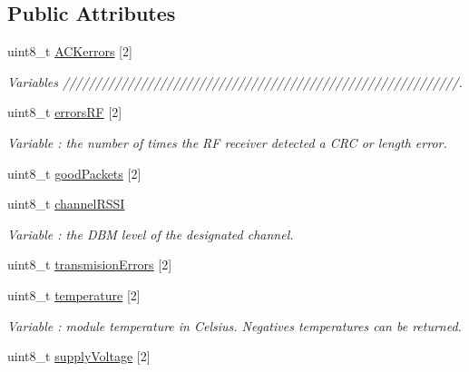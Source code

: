 \subsection*{Public Attributes}
\begin{DoxyCompactItemize}
\item 
uint8\+\_\+t \hyperlink{class_wasp_x_bee868_aa053fc0674006ca7bc24933afcb5e437}{A\+C\+Kerrors} \mbox{[}2\mbox{]}
\begin{DoxyCompactList}\small\item\em Variables /////////////////////////////////////////////////////////////. \end{DoxyCompactList}\item 
uint8\+\_\+t \hyperlink{class_wasp_x_bee868_a608f640c2c284306b5d25d106bc3927a}{errors\+RF} \mbox{[}2\mbox{]}\hypertarget{class_wasp_x_bee868_a608f640c2c284306b5d25d106bc3927a}{}\label{class_wasp_x_bee868_a608f640c2c284306b5d25d106bc3927a}

\begin{DoxyCompactList}\small\item\em Variable \+: the number of times the RF receiver detected a C\+RC or length error. \end{DoxyCompactList}\item 
uint8\+\_\+t \hyperlink{class_wasp_x_bee868_ab84ac057bd6a8698e3411523d71c6bfc}{good\+Packets} \mbox{[}2\mbox{]}
\item 
uint8\+\_\+t \hyperlink{class_wasp_x_bee868_a23f911b0cfd26c65ac259229231c3ffd}{channel\+R\+S\+SI}\hypertarget{class_wasp_x_bee868_a23f911b0cfd26c65ac259229231c3ffd}{}\label{class_wasp_x_bee868_a23f911b0cfd26c65ac259229231c3ffd}

\begin{DoxyCompactList}\small\item\em Variable \+: the D\+BM level of the designated channel. \end{DoxyCompactList}\item 
uint8\+\_\+t \hyperlink{class_wasp_x_bee868_af213d73818fe69e28e1ee308c19adc75}{transmision\+Errors} \mbox{[}2\mbox{]}
\item 
uint8\+\_\+t \hyperlink{class_wasp_x_bee868_a381d31ff7de24cd5f2e2a71f0c934f19}{temperature} \mbox{[}2\mbox{]}\hypertarget{class_wasp_x_bee868_a381d31ff7de24cd5f2e2a71f0c934f19}{}\label{class_wasp_x_bee868_a381d31ff7de24cd5f2e2a71f0c934f19}

\begin{DoxyCompactList}\small\item\em Variable \+: module temperature in Celsius. Negatives temperatures can be returned. \end{DoxyCompactList}\item 
uint8\+\_\+t \hyperlink{class_wasp_x_bee868_acd6d66491619c27943425001ecad5cf8}{supply\+Voltage} \mbox{[}2\mbox{]}\hypertarget{class_wasp_x_bee868_acd6d66491619c27943425001ecad5cf8}{}\label{class_wasp_x_bee868_acd6d66491619c27943425001ecad5cf8}


\end{DoxyCompactItemize}
